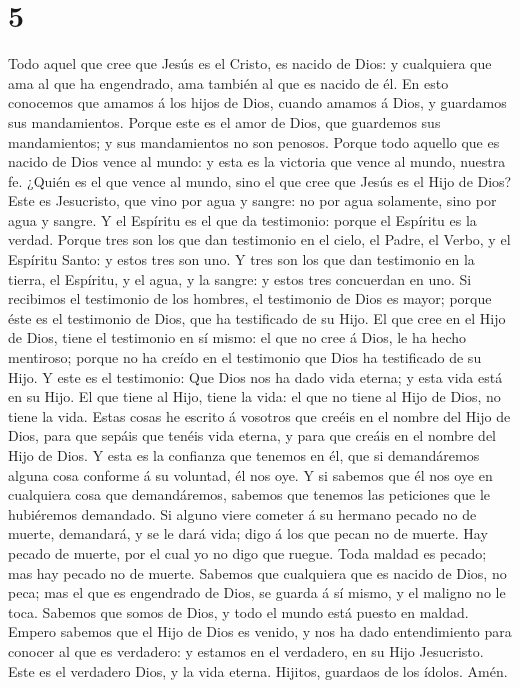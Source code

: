 \hypertarget{section-4}{%
\section{5}\label{section-4}}

 Todo aquel que cree que Jesús es el Cristo, es nacido de
Dios: y cualquiera que ama al que ha engendrado, ama también al que es
nacido de él.  En esto conocemos que amamos á los hijos de
Dios, cuando amamos á Dios, y guardamos sus mandamientos. 
Porque este es el amor de Dios, que guardemos sus mandamientos; y sus
mandamientos no son penosos.  Porque todo aquello que es
nacido de Dios vence al mundo: y esta es la victoria que vence al mundo,
nuestra fe.  ¿Quién es el que vence al mundo, sino el que
cree que Jesús es el Hijo de Dios?  Este es Jesucristo,
que vino por agua y sangre: no por agua solamente, sino por agua y
sangre. Y el Espíritu es el que da testimonio: porque el Espíritu es la
verdad.  Porque tres son los que dan testimonio en el
cielo, el Padre, el Verbo, y el Espíritu Santo: y estos tres son uno.
 Y tres son los que dan testimonio en la tierra, el
Espíritu, y el agua, y la sangre: y estos tres concuerdan en uno.
 Si recibimos el testimonio de los hombres, el testimonio
de Dios es mayor; porque éste es el testimonio de Dios, que ha
testificado de su Hijo.  El que cree en el Hijo de Dios,
tiene el testimonio en sí mismo: el que no cree á Dios, le ha hecho
mentiroso; porque no ha creído en el testimonio que Dios ha testificado
de su Hijo.  Y este es el testimonio: Que Dios nos ha
dado vida eterna; y esta vida está en su Hijo.  El que
tiene al Hijo, tiene la vida: el que no tiene al Hijo de Dios, no tiene
la vida.  Estas cosas he escrito á vosotros que creéis en
el nombre del Hijo de Dios, para que sepáis que tenéis vida eterna, y
para que creáis en el nombre del Hijo de Dios.  Y esta es
la confianza que tenemos en él, que si demandáremos alguna cosa conforme
á su voluntad, él nos oye.  Y si sabemos que él nos oye
en cualquiera cosa que demandáremos, sabemos que tenemos las peticiones
que le hubiéremos demandado.  Si alguno viere cometer á
su hermano pecado no de muerte, demandará, y se le dará vida; digo á los
que pecan no de muerte. Hay pecado de muerte, por el cual yo no digo que
ruegue.  Toda maldad es pecado; mas hay pecado no de
muerte.  Sabemos que cualquiera que es nacido de Dios, no
peca; mas el que es engendrado de Dios, se guarda á sí mismo, y el
maligno no le toca.  Sabemos que somos de Dios, y todo el
mundo está puesto en maldad.  Empero sabemos que el Hijo
de Dios es venido, y nos ha dado entendimiento para conocer al que es
verdadero: y estamos en el verdadero, en su Hijo Jesucristo. Este es el
verdadero Dios, y la vida eterna.  Hijitos, guardaos de
los ídolos. Amén.
